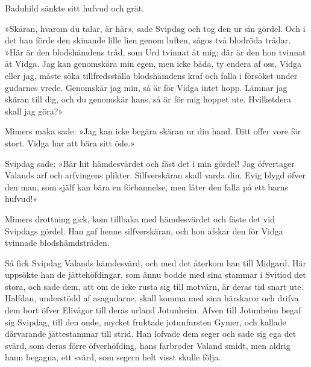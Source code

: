 Baduhild sänkte sitt hufvud och grät.

»Skäran, hvarom du talar, är här», sade Svipdag och tog den ur sin
gördel. Och i det han förde den skinande lille lien genom luften, sågos
två blodröda trådar. »Här är den blodshämdens tråd, som Urd tvinnat åt
mig; där är den hon tvinnat åt Vidga. Jag kan genomskära min egen, men
icke båda, ty endera af oss, Vidga eller jag, måste söka tillfredsställa
blodshämdens kraf och falla i försöket under gudarnes vrede. Genomskär
jag min, så är för Vidga intet hopp. Lämnar jag skäran till dig, och du
genomskär hans, så är för mig hoppet ute. Hvilketdera skall jag göra?»

Mimers maka sade: »Jag kan icke begära skäran ur din hand. Ditt offer
vore för stort. Vidga har att bära sitt öde.»

Svipdag sade: »Bär hit hämdesvärdet och fäst det i min gördel! Jag
öfvertager Valands arf och arfvingens plikter. Silfverskäran skall varda
din. Evig blygd öfver den man, som själf kan bära en förbannelse, men
låter den falla på ett barns hufvud!»

Mimers drottning gick, kom tillbaka med hämdesvärdet och fäste det vid
Svipdags gördel. Han gaf henne silfverskäran, och hon afskar den för
Vidga tvinnade blodshämdstråden.

Så fick Svipdag Valands hämdesvärd, och med det återkom han till
Midgard. Här uppsökte han de jättehöfdingar, som ännu bodde med sina
stammar i Svitiod det stora, och sade dem, att om de icke rusta sig till
motvärn, är deras tid snart ute. Halfdan, understödd af asagudarne,
skall komma med sina härskaror och drifva dem bort öfver Elivågor till
deras urland Jotunheim. Äfven till Jotunheim begaf sig Svipdag, till den
onde, mycket fruktade jotunfursten Gymer, och kallade därvarande
jättestammar till strid. Han lofvade dem seger och sade sig ega det
svärd, som deras förre
öfverhöfding\protect\hypertarget{lb1625905.xhtmlux5cux23start123}{}{}\protect\hypertarget{lb1625905.xhtmlux5cux23start123-a}{}{}\protect\hypertarget{lb1625905.xhtmlux5cux23start123-b}{}{}\protect\hypertarget{lb1625905.xhtmlux5cux23start123-c}{}{}\protect\hypertarget{lb1625905.xhtmlux5cux23start123-d}{}{},
hans farbroder Valand smidt, men aldrig hann begagna, ett svärd, som
segern helt visst skulle följa.

